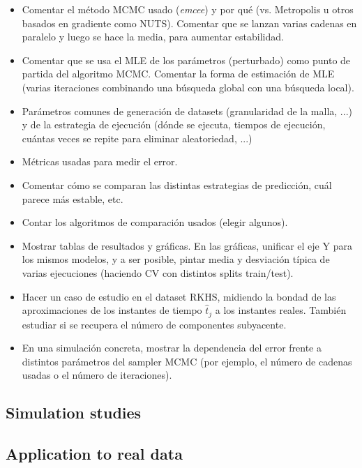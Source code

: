 \documentclass[ba]{imsart}
\numberwithin{equation}{section}
\theoremstyle{plain}
\newenvironment{comment}[1][comment-red]
{
\noindent \color{#1}
}
{
\color{black}
}
\begin{document}
\newpage

\begin{comment}
  \begin{itemize}
    \item Comentar el método MCMC usado (\textit{emcee}) y por qué (vs. Metropolis u otros basados en gradiente como NUTS). Comentar que se lanzan varias cadenas en paralelo y luego se hace la media, para aumentar estabilidad.
    \item Comentar que se usa el MLE de los parámetros (perturbado) como punto de partida del algoritmo MCMC. Comentar la forma de estimación de MLE (varias iteraciones combinando una búsqueda global con una búsqueda local).
    \item Parámetros comunes de generación de datasets (granularidad de la malla, ...) y de la estrategia de ejecución (dónde se ejecuta, tiempos de ejecución, cuántas veces se repite para eliminar aleatoriedad, ...)
    \item Métricas usadas para medir el error.
    \item Comentar cómo se comparan las distintas estrategias de predicción, cuál parece más estable, etc.
    \item Contar los algoritmos de comparación usados (elegir algunos).
    \item Mostrar tablas de resultados y gráficas. En las gráficas, unificar el eje Y para los mismos modelos, y a ser posible, pintar media y desviación típica de varias ejecuciones (haciendo CV con distintos splits train/test).
    \item Hacer un caso de estudio en el dataset RKHS, midiendo la bondad de las aproximaciones de los instantes de tiempo \(\hat t_j\) a los instantes reales. También estudiar si se recupera el número de componentes subyacente.
    \item En una simulación concreta, mostrar la dependencia del error frente a distintos parámetros del sampler MCMC (por ejemplo, el número de cadenas usadas o el número de iteraciones).
\end{itemize}
\end{comment}

\subsection{Simulation studies}

\subsection{Application to real data}
\end{document}
